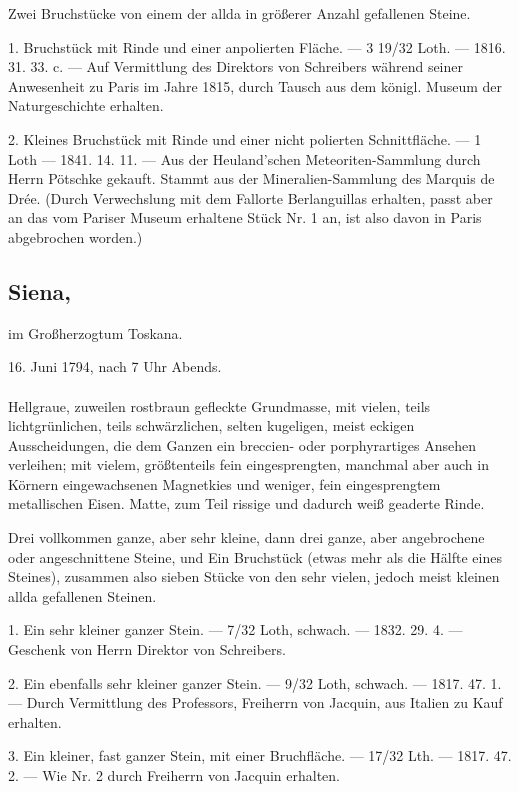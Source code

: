 \documentclass[a4paper, 11pt, oneside, polutonikogreek, german]{article}
\begin{document}
Zwei Bruchstücke von einem der allda in größerer Anzahl gefallenen Steine.

1. Bruchstück mit Rinde und einer anpolierten Fläche. — 3 19/32 Loth. — 1816. 31. 33. c. — Auf Vermittlung des Direktors von Schreibers während seiner Anwesenheit zu Paris im Jahre 1815, durch Tausch aus dem königl. Museum der Naturgeschichte erhalten.

2. Kleines Bruchstück mit Rinde und einer nicht polierten Schnittfläche. — 1 Loth — 1841. 14. 11. — Aus der Heuland'schen Meteoriten-Sammlung durch Herrn Pötschke gekauft. Stammt aus der Mineralien-Sammlung des Marquis de Drée. (Durch Verwechslung mit dem Fallorte Berlanguillas erhalten, passt aber an das vom Pariser Museum erhaltene Stück Nr. 1 an, ist also davon in Paris abgebrochen worden.)
\subsection[Siena.]{Siena,}
\begin{center}
\small
im Großherzogtum Toskana.

16. Juni 1794, nach 7 Uhr Abends.
\end{center}
\paragraph{}
Hellgraue, zuweilen rostbraun gefleckte Grundmasse, mit vielen, teils lichtgrünlichen, teils schwärzlichen, selten kugeligen, meist eckigen Ausscheidungen, die dem Ganzen ein breccien- oder porphyrartiges Ansehen verleihen; mit vielem, größtenteils fein eingesprengten, manchmal aber auch in Körnern eingewachsenen Magnetkies und weniger, fein eingesprengtem metallischen Eisen. Matte, zum Teil rissige und dadurch weiß geaderte Rinde.

Drei vollkommen ganze, aber sehr kleine, dann drei ganze, aber angebrochene oder angeschnittene Steine, und Ein Bruchstück (etwas mehr als die Hälfte eines Steines), zusammen also sieben Stücke von den sehr vielen, jedoch meist kleinen allda gefallenen Steinen.

1. Ein sehr kleiner ganzer Stein. — 7/32 Loth, schwach. — 1832. 29. 4. — Geschenk von Herrn Direktor von Schreibers.

2. Ein ebenfalls sehr kleiner ganzer Stein. — 9/32 Loth, schwach. — 1817. 47. 1. — Durch Vermittlung des Professors, Freiherrn von Jacquin, aus Italien zu Kauf erhalten.

3. Ein kleiner, fast ganzer Stein, mit einer Bruchfläche. — 17/32 Lth. — 1817. 47. 2. — Wie Nr. 2 durch Freiherrn von Jacquin erhalten.
\end{document}
